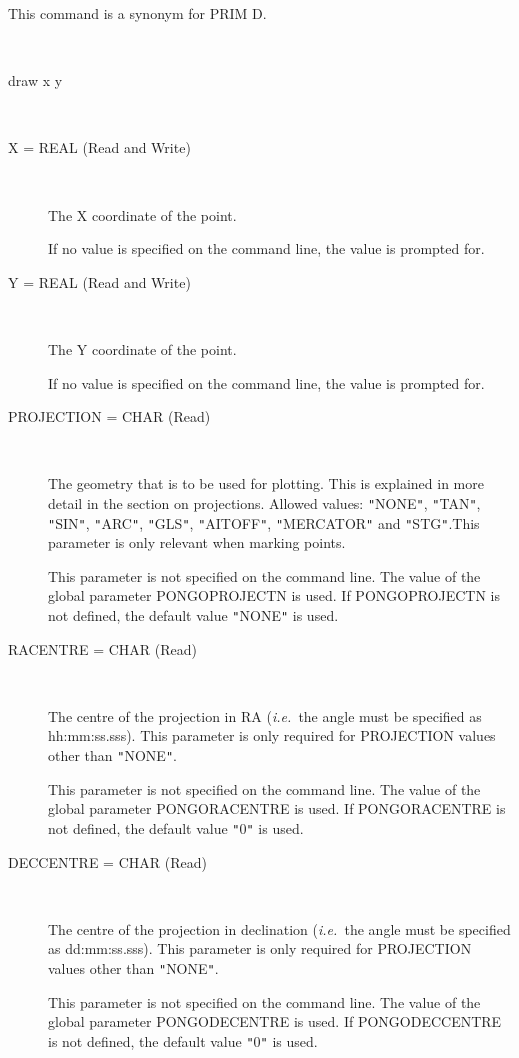 \documentclass[twoside,11pt]{article}
\newcommand{\htmlref}[2]{#1}
\renewcommand{\_}{\texttt{\symbol{95}}}
\newcommand{\ie}{{\em i.e.\ }}
\newcommand{\iref} [1]{\htmlref{#1}{#1}}
\newcommand{\sstusage}[1]{\item[Usage:] \mbox{}
\\[1.3ex]{\raggedright \ssttt #1}}
\newcommand{\sstparameters}[1]{
   \item[Parameters:] \mbox{} \\
   \vspace{-3.5ex}
   \begin{description}
      #1
   \end{description}
}
\newcommand{\sstsubsection}[1]{ \item[{#1}] \mbox{} \\}
\newcommand{\sstusage}[1]{\item[Usage:]
      \begin{description}
         {\ssttt #1}
      \end{description}
      \\
   }
\newcommand{\sstparameters}[1]{
      \item[Parameters:] \\
      \begin{description}
         #1
      \end{description}
      \\
   }
\newcommand{\sstsubsection}[1]{\item[{#1}]}
\begin{document}
\begin{sloppypar}
{{      This command is a synonym for \iref{PRIM} D.
   }
   \sstusage{
      draw x y
   }
   \sstparameters{
      \sstsubsection{
         X = \_REAL (Read and Write)
      }{
         The X coordinate of the point.

         If no value is specified on the command line, the value is
         prompted for.
      }
      \sstsubsection{
         Y = \_REAL (Read and Write)
      }{
         The Y coordinate of the point.

         If no value is specified on the command line, the value is
         prompted for.
      }
      \sstsubsection{
         PROJECTION = \_CHAR (Read)
      }{
         The geometry that is to be used for plotting. This is
         explained in more detail in the section on projections.
         Allowed values: {\tt "}NONE{\tt "}, {\tt "}TAN{\tt "}, {\tt "}SIN{\tt "}, {\tt "}ARC{\tt "}, {\tt "}GLS{\tt "}, {\tt "}AITOFF{\tt "},
         {\tt "}MERCATOR{\tt "} and {\tt "}STG{\tt "}.This parameter is only
         relevant when marking points.

         This parameter is not specified on the command line. The value
         of the global parameter PONGO\_PROJECTN is used. If
         PONGO\_PROJECTN is not defined, the default value {\tt "}NONE{\tt "} is
         used.
      }
      \sstsubsection{
         RACENTRE = \_CHAR (Read)
      }{
         The centre of the projection in RA (\ie the angle must be
         specified as hh:mm:ss.sss). This parameter is only required for
         PROJECTION values other than {\tt "}NONE{\tt "}.

         This parameter is not specified on the command line. The value
         of the global parameter PONGO\_RACENTRE is used. If
         PONGO\_RACENTRE is not defined, the default value {\tt "}0{\tt "} is used.
      }
      \sstsubsection{
         DECCENTRE = \_CHAR (Read)
      }{
         The centre of the projection in declination (\ie the angle
         must be specified as dd:mm:ss.sss). This parameter is only
         required for PROJECTION values other than {\tt "}NONE{\tt "}.

         This parameter is not specified on the command line. The value
         of the global parameter PONGO\_DECENTRE is used. If
         PONGO\_DECCENTRE is not defined, the default value {\tt "}0{\tt "} is used.
      }
   }
}


\end{sloppypar}
\end{document}
